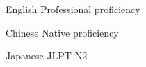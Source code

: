
\begin{cvskills}

  \cvskill
    {English} %
    {Professional proficiency} %

  \cvskill
    {Chinese} %
    {Native proficiency} %
    
\cvskill
	{Japanese} %
	{JLPT N2} %
    
\end{cvskills}
